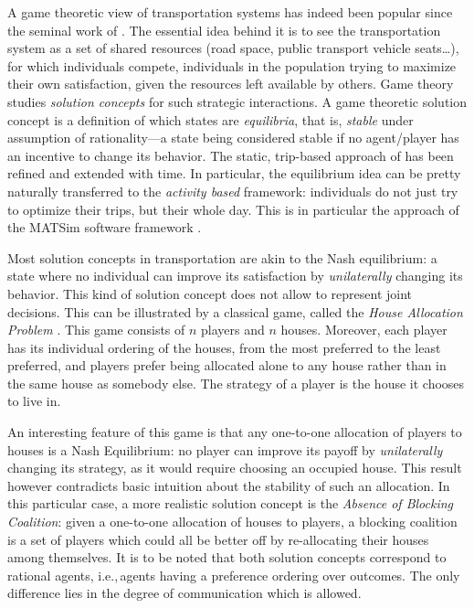 {A game theoretic view of transportation systems has indeed been popular since the seminal work of \citet{Wardrop_PICE_1952}. The essential idea behind it is to see the transportation system as a set of shared resources (road space, public transport vehicle seats\ldots), for which individuals compete, individuals in the population trying to maximize their own satisfaction, given the resources left available by others. Game theory studies \emph{solution concepts} for such strategic interactions. A game theoretic solution concept is a definition of which states are \emph{equilibria}, that is, \emph{stable} under assumption of rationality---a state being considered stable if no agent/player has an incentive to change its behavior. The static, trip-based approach of \citet{Wardrop_PICE_1952} has been refined and extended with time. In particular, the equilibrium idea can be pretty naturally transferred to the \emph{activity based} framework: individuals do not just try to optimize their trips, but their whole day. This is in particular the approach of the MATSim software framework \citep{Axhausen_SSRL_2006,NagelFloetteroed_IATBR_2009}.

Most solution concepts in transportation are akin to the Nash equilibrium: a state where no individual can improve its satisfaction by \emph{unilaterally} changing its behavior. This kind of solution concept does not allow to represent joint decisions. This can be illustrated by a classical game, called the \emph{House Allocation Problem} \citep{SchummerVohra_NisanEtAl_2007}. This game consists of $n$ players and $n$ houses. Moreover, each player has its individual ordering of the houses, from the most preferred to the least preferred, and players prefer being allocated alone to any house rather than in the same house as somebody else. The strategy of a player is the house it chooses to live in.

An interesting feature of this game is that any one-to-one allocation of players to houses is a Nash Equilibrium: no player can improve its payoff by \emph{unilaterally} changing its strategy, as it would require choosing an occupied house. This result however contradicts basic intuition about the stability of such an allocation. In this particular case, a more realistic solution concept is the \emph{Absence of Blocking Coalition}: given a one-to-one allocation of houses to players, a blocking coalition is a set of players which could all be better off by re-allocating their houses among themselves. It is to be noted that both solution concepts correspond to rational agents, i.e.,\,agents having a preference ordering over outcomes. The only difference lies in the degree of communication which is allowed.

}
